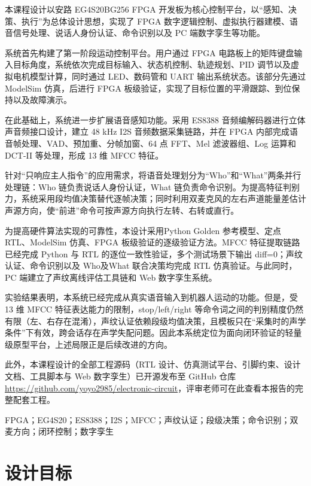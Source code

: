 \documentclass[UTF8,zihao=-4,fontset=windows]{ctexart}
\begin{document}
本课程设计以安路 EG4S20BG256 FPGA 开发板为核心控制平台，以“感知、决策、执行”为总体设计思想，实现了 FPGA 数字逻辑控制、虚拟执行器建模、语音信号处理、说话人身份认证、命令识别以及 PC 端数字孪生等功能。

系统首先构建了第一阶段运动控制平台。用户通过 FPGA 电路板上的矩阵键盘输入目标角度，系统依次完成目标输入、状态机控制、轨迹规划、PID 调节以及虚拟电机模型计算，同时通过 LED、数码管和 UART 输出系统状态。该部分先通过 ModelSim 仿真，后进行 FPGA 板级验证，实现了目标位置的平滑跟踪、到位保持以及故障演示。

在此基础上，系统进一步扩展语音感知功能。采用 ES8388 音频编解码器进行立体声音频接口设计，建立 48 kHz I2S 音频数据采集链路，并在 FPGA 内部完成语音帧处理、VAD、预加重、分帧加窗、64 点 FFT、Mel 滤波器组、Log 运算和 DCT-II 等处理，形成 13 维 MFCC 特征。

针对“只响应主人指令”的应用需求，将语音处理划分为“Who”和“What”两条并行处理链：Who 链负责说话人身份认证，What 链负责命令识别。为提高特征判别力，系统采用段均值决策替代逐帧决策；同时利用双麦克风的左右声道能量差估计声源方向，使“前进”命令可按声源方向执行左转、右转或直行。

为提高硬件算法实现的可靠性，本设计采用Python Golden 参考模型、定点 RTL、ModelSim 仿真、FPGA 板级验证的逐级验证方法。MFCC 特征提取链路已经完成 Python 与 RTL 的逐位一致性验证，多个测试场景下输出 diff=0；声纹认证、命令识别以及 Who及What 联合决策均完成 RTL 仿真验证。与此同时，PC 端建立了声纹离线评估工具链和 Web 数字孪生系统。

实验结果表明，本系统已经完成从真实语音输入到机器人运动的功能。但是，受 13 维 MFCC 特征表达能力的限制，stop/left/right 等命令词之间的判别精度仍然有限（左、右存在混淆），声纹认证依赖段级均值决策，且模板只在“采集时的声学条件”下有效，跨会话存在声学失配问题。因此本系统定位为面向闭环验证的轻量级原型平台，上述局限正是后续改进的方向。

此外，本课程设计的全部工程源码（RTL 设计、仿真测试平台、引脚约束、设计文档、工具脚本与 Web 数字孪生）已开源发布至 GitHub 仓库 \url{https://github.com/yoyo2985/electronic-circuit}，评审老师可在此查看本报告的完整配套工程。

\par\medskip
{}
FPGA；EG4S20；ES8388；I2S；MFCC；声纹认证；段级决策；命令识别；双麦方向；闭环控制；数字孪生

\clearpage

\section{设计目标}
\end{document}

